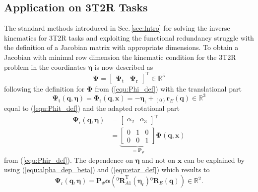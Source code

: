 \documentclass[twocolumn,10pt]{IFTOMM}
\newcommand{\bm}[1]{\boldsymbol{#1}}
\newcommand{\ortvek}[4]{{ }_{(#1)}{\boldsymbol{#2}}^{#3}_{#4} }
\newcommand{\rotmat}[2]{{{ }^{#1}\boldsymbol{R}}_{#2}}
\newcommand{\transp}[0]{{\mathrm{T}}}
\begin{document}
\subsection{Application on 3T2R Tasks}
\label{sec:RecEulAng_3T2R_app}

The standard methods introduced in Sec.\,\ref{sec:Intro} for solving the inverse kinematics for 3T2R tasks and exploiting the functional redundancy struggle with the definition of a Jacobian matrix with appropriate dimensions.
To obtain a Jacobian with minimal row dimension the kinematic condition for the 3T2R problem in the coordinates $\bm{\eta}$ is now described as
%
\begin{equation}
\bm{\Psi}=\begin{bmatrix}
\bm{\Psi}_{\mathrm{t}} & \bm{\Psi}_{\mathrm{r}}
\end{bmatrix}^\transp \in {\mathbb{R}}^{5}
\end{equation}
%
following the definition for $\bm{\Phi}$ from (\ref{equ:Phi_def}) with the translational part
%
\begin{equation}
\bm{\Psi}_{\mathrm{t}}(\bm{q},\bm{\eta}) 
= 
\bm{\Phi}_{\mathrm{t}}(\bm{q},\bm{x}) 
=
- \bm{\eta}_{\mathrm{t}} + \ortvek{0}{r}{}{E}(\bm{q}) \in {\mathbb{R}}^{3}
\end{equation}
%
equal to (\ref{equ:Phit_def}) and the adapted rotational part
%
\begin{align}
\bm{\Psi}_{\mathrm{r}}(\bm{q},\bm{\eta}) &= 
\begin{bmatrix}
\alpha_2  & \alpha_3
\end{bmatrix}^\transp \nonumber \\
&=
\underbrace{\begin{bmatrix}
    0 & 1 & 0  \\ 
    0 & 0 & 1
    \end{bmatrix}}_{=\bm{P}_{\Psi}}
 \bm{\Phi} (\bm{q},\bm{x})
\label{equ:Psir_def}
\end{align}
%
from (\ref{equ:Phir_def}). 
The dependence on $\bm{\eta}$ and not on $\bm{x}$ can be explained by using (\ref{equ:alpha_dep_beta}) and (\ref{equ:etar_def}) which results to
%
\begin{equation}
\bm{\Psi}_{\mathrm{r}}(\bm{q},\bm{\eta}) = \bm{P}_{\Psi} \bm{\alpha}\left(\rotmat{0}{A1}^\transp (\bm{\eta}_{\mathrm{r}})\rotmat{0}{E}(\bm{q})\right) \in {\mathbb{R}}^{2}.
\end{equation}
\end{document}
